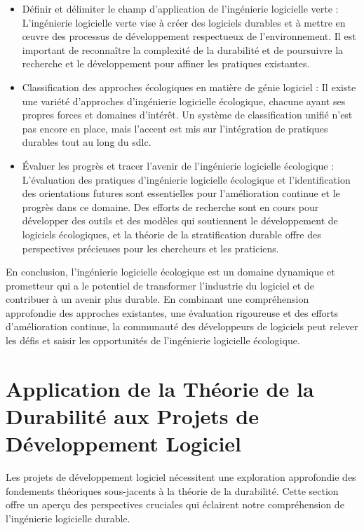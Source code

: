\begin{itemize}
    \item Définir et délimiter le champ d'application de l'ingénierie logicielle verte : L'ingénierie logicielle verte vise à créer des logiciels durables et à mettre en œuvre des processus de développement respectueux de l'environnement. Il est important de reconnaître la complexité de la durabilité et de poursuivre la recherche et le développement pour affiner les pratiques existantes.
    \item Classification des approches écologiques en matière de génie logiciel : Il existe une variété d'approches d'ingénierie logicielle écologique, chacune ayant ses propres forces et domaines d'intérêt. Un système de classification unifié n'est pas encore en place, mais l'accent est mis sur l'intégration de pratiques durables tout au long du \acrshort{sdlc}.
    \item Évaluer les progrès et tracer l'avenir de l'ingénierie logicielle écologique : L'évaluation des pratiques d'ingénierie logicielle écologique et l'identification des orientations futures sont essentielles pour l'amélioration continue et le progrès dans ce domaine. Des efforts de recherche sont en cours pour développer des outils et des modèles qui soutiennent le développement de logiciels écologiques, et la théorie de la stratification durable offre des perspectives précieuses pour les chercheurs et les praticiens.
\end{itemize}

En conclusion, l'ingénierie logicielle écologique est un domaine dynamique et prometteur qui a le potentiel de transformer l'industrie du logiciel et de contribuer à un avenir plus durable. En combinant une compréhension approfondie des approches existantes, une évaluation rigoureuse et des efforts d'amélioration continue, la communauté des développeurs de logiciels peut relever les défis et saisir les opportunités de l'ingénierie logicielle écologique.


\section{Application de la Théorie de la Durabilité aux Projets de Développement Logiciel}\label{sec:dimensions-durabilite}

Les projets de développement logiciel nécessitent une exploration approfondie des fondements théoriques sous-jacents à la théorie de la durabilité. Cette section offre un aperçu des perspectives cruciales qui éclairent notre compréhension de l'ingénierie logicielle durable.

